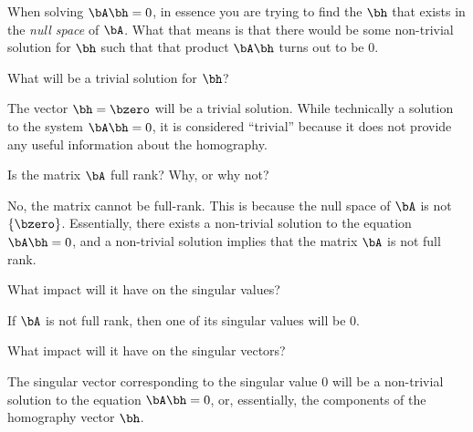 \newpage
\begin{problem}
  When solving $\bA \bh = 0$, in essence you are trying
  to find the $\bh$ that exists in the \emph{null space} of $\bA$.
  What that means is that there would be some non-trivial solution
  for $\bh$ such that that product $\bA \bh$ turns out to be $0$.
  \begin{enumroman}
    \item What will be a trivial solution for $\bh$?
      \begin{answer}
        The vector $\bh = \bzero$ will be a trivial solution.
        While technically a solution to the system $\bA \bh = 0$,
        it is considered ``trivial'' because it does not provide
        any useful information about the homography.
      \end{answer}
    \item Is the matrix $\bA$ full rank? Why, or why not?
      \begin{answer}
        No, the matrix cannot be full-rank.
        This is because the null space of $\bA$ is not $\set{ \bzero }$.
        Essentially, there exists a non-trivial solution to the equation
        $\bA \bh = 0$, and a non-trivial solution implies that the
        matrix $\bA$ is not full rank.
      \end{answer}
    \item What impact will it have on the singular values?
      \begin{answer}
        If $\bA$ is not full rank, then one of its singular values
        will be $0$.
      \end{answer}
    \item What impact will it have on the singular vectors?
      \begin{answer}
        The singular vector corresponding to the singular value $0$
        will be a non-trivial solution to the equation $\bA \bh = 0$,
        or, essentially, the components of the homography vector
        $\bh$.
      \end{answer}
  \end{enumroman}
\end{problem}
